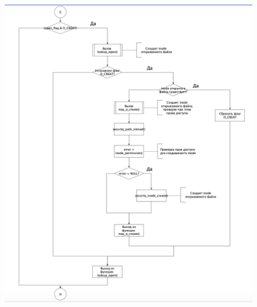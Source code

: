 \documentclass[a4paper,12pt]{article}
\begin{document}
	\begin{figure}[h!]
		\begin{center}
			{\includegraphics[scale = 0.8]{6.png}}
			\label{6}
		\end{center}
	\end{figure}
\end{document}
